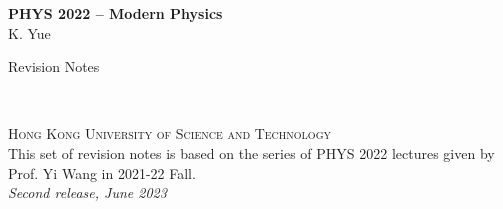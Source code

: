 \documentclass[12pt]{book} %
\numberwithin{equation}{chapter}
\begin{document}

\begingroup
\thispagestyle{empty}
\centering
\vspace*{0cm}
\par\normalfont\fontsize{35}{35}\sffamily\selectfont
\textbf{PHYS 2022 -- Modern Physics}\\
{\LARGE K. Yue}\par %
\vspace*{1cm}
{\Huge Revision Notes}\par %
\endgroup


\newpage
~\vfill
\thispagestyle{empty}

\noindent \textsc{Hong Kong University of Science and Technology}\\
\noindent This set of revision notes is based on the series of PHYS 2022 lectures given by Prof. Yi Wang in 2021-22 Fall.\\ %

\noindent \textit{Second release, June 2023} %



\pagestyle{empty} %

\tableofcontents %


\pagestyle{fancy} %

\end{document}
